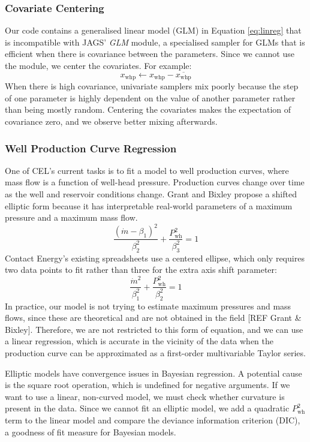 \documentclass[a4paper, 12pt]{article}
\begin{document}
\subsubsection{Covariate Centering}
Our code contains a generalised linear model (GLM) in Equation \ref{eq:linreg} that is incompatible with JAGS' \emph{GLM} module, a specialised sampler for GLMs that is efficient when there is covariance between the parameters. Since we cannot use the module, we center the covariates. For example:
\begin{equation}
x_\text{whp} \leftarrow x_\text{whp} - \overline{x_\text{whp}}
\end{equation}
When there is high covariance, univariate samplers mix poorly because the step of one parameter is highly dependent on the value of another parameter rather than being mostly random. Centering the covariates makes the expectation of covariance zero, and we observe better mixing afterwards.

\subsubsection{Well Production Curve Regression}
One of CEL's current tasks is to fit a model to well production curves, where mass flow is a function of well-head pressure. Production curves change over time as the well and reservoir conditions change. Grant and Bixley propose a shifted elliptic form because it has interpretable real-world parameters of a maximum pressure and a maximum mass flow.
\begin{equation}
\frac{\left( \dot{m}-\beta_1 \right)^2}{\beta_2^2} + \frac{P_\text{wh}^2}{\beta_3^2} = 1
\end{equation}
Contact Energy's existing spreadsheets use a centered ellipse, which only requires two data points to fit rather than three for the extra axis shift parameter:
\begin{equation}
\frac{\dot{m}^2}{\beta_1^2} + \frac{P_\text{wh}^2}{\beta_2^2} = 1
\end{equation}
In practice, our model is not trying to estimate maximum pressures and mass flows, since these are theoretical and are not obtained in the field [REF Grant \& Bixley]. Therefore, we are not restricted to this form of equation, and we can use a linear regression, which is accurate in the vicinity of the data when the production curve can be approximated as a first-order multivariable Taylor series.

Elliptic models have convergence issues in Bayesian regression. A potential cause is the square root operation, which is undefined for negative arguments. If we want to use a linear, non-curved model, we must check whether curvature is present in the data. Since we cannot fit an elliptic model, we add a quadratic $P_\text{wh}^2$ term to the linear model and compare the deviance information criterion (DIC), a goodness of fit measure for Bayesian models. 
\end{document}
